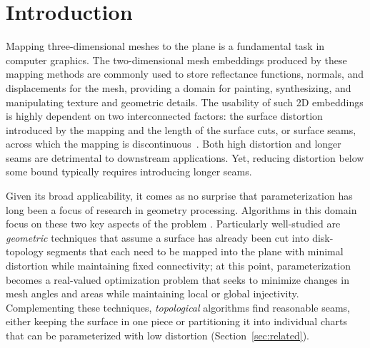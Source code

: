 
\section{Introduction}
Mapping three-dimensional meshes to the plane is a fundamental task in computer graphics.  The two-dimensional mesh embeddings produced by these mapping methods are commonly used to store reflectance functions, normals, and displacements
for the mesh, providing a domain for painting, synthesizing, and manipulating texture and geometric details. 
The usability of such 2D embeddings is highly dependent on two interconnected factors: the surface distortion introduced by the mapping and the length of the surface cuts, or surface seams, across which the mapping is discontinuous~\cite{Sheffer07_ParameterizationSurvey,Hormann2008}. Both high distortion and longer seams are detrimental to downstream applications. Yet, reducing distortion below some %
bound typically requires introducing longer seams. 

Given its broad applicability, it comes as no surprise that parameterization has long been a focus of research in geometry processing.  Algorithms in this domain focus on these two key aspects of the problem \cite{Sheffer07_ParameterizationSurvey,Hormann2008}.  Particularly well-studied are \emph{geometric} techniques that assume a surface has already been cut into disk-topology segments %
 that each need to be mapped into the plane with minimal distortion while maintaining fixed connectivity; at this point, parameterization becomes a real-valued optimization problem that seeks to minimize changes in mesh angles and areas while maintaining local or global injectivity. Complementing these techniques, \emph{topological} algorithms find reasonable seams, either keeping the surface in one piece or partitioning it into individual charts that can be parameterized with low distortion (Section~\ref{sec:related}).   

